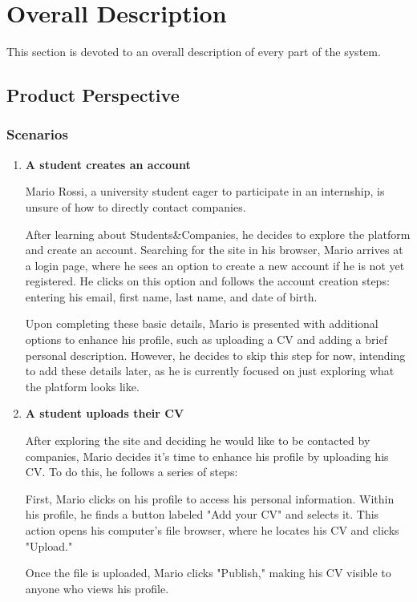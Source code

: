 \chapter{Overall Description}
This section is devoted to an overall description of every part of the system.

\section{Product Perspective}
\subsection{Scenarios}

\begin{enumerate}
    \item \textbf{A student creates an account}

    Mario Rossi, a university student eager to participate in an internship, is unsure of how to directly contact companies. 
    
    After learning about Students\&Companies, he decides to explore the platform and create an account. Searching for the site in his browser, Mario arrives at a login page, where he sees an option to create a new account if he is not yet registered. He clicks on this option and follows the account creation steps: entering his email, first name, last name, and date of birth.
    
    Upon completing these basic details, Mario is presented with additional options to enhance his profile, such as uploading a CV and adding a brief personal description. However, he decides to skip this step for now, intending to add these details later, as he is currently focused on just exploring what the platform looks like.
    \item \textbf{A student uploads their CV}

    After exploring the site and deciding he would like to be contacted by companies, Mario decides it’s time to enhance his profile by uploading his CV. To do this, he follows a series of steps:

    First, Mario clicks on his profile to access his personal information. Within his profile, he finds a button labeled "Add your CV" and selects it. This action opens his computer's file browser, where he locates his CV and clicks "Upload." 
    
    Once the file is uploaded, Mario clicks "Publish," making his CV visible to anyone who views his profile.


\end{enumerate}
